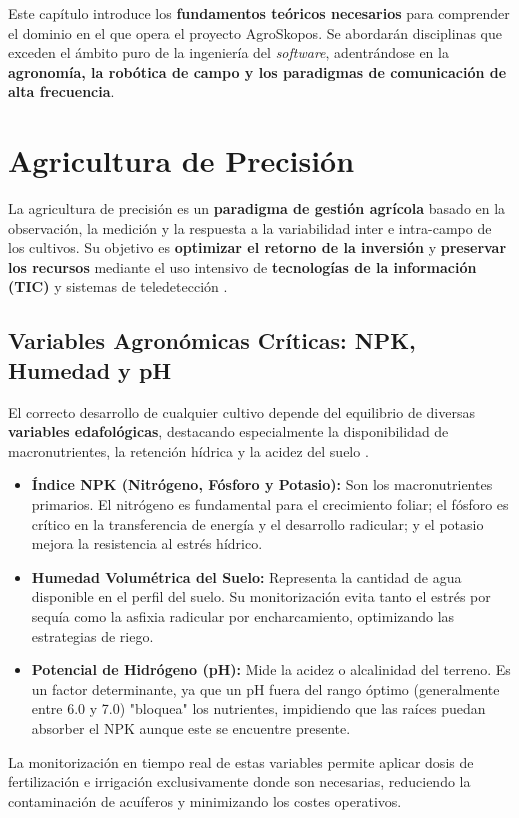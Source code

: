 
Este capítulo introduce los \textbf{fundamentos teóricos necesarios} para comprender el dominio en el que opera el proyecto AgroSkopos. Se abordarán disciplinas que exceden el ámbito puro de la ingeniería del \textit{software}, adentrándose en la \textbf{agronomía, la robótica de campo y los paradigmas de comunicación de alta frecuencia}.

\section{Agricultura de Precisión}

La agricultura de precisión es un \textbf{paradigma de gestión agrícola} basado en la observación, la medición y la respuesta a la variabilidad inter e intra-campo de los cultivos. Su objetivo es \textbf{optimizar el retorno de la inversión} y \textbf{preservar los recursos} mediante el uso intensivo de \textbf{tecnologías de la información (TIC)} y sistemas de teledetección \cite{zhang2002precision, mulla2013twenty}.

\subsection{Variables Agronómicas Críticas: NPK, Humedad y pH}
El correcto desarrollo de cualquier cultivo depende del equilibrio de diversas \textbf{variables edafológicas}, destacando especialmente la disponibilidad de macronutrientes, la retención hídrica y la acidez del suelo \cite{npk_concept, brady2008nature}.
\begin{itemize}
    \item \textbf{Índice NPK (Nitrógeno, Fósforo y Potasio):} Son los macronutrientes primarios. El nitrógeno es fundamental para el crecimiento foliar; el fósforo es crítico en la transferencia de energía y el desarrollo radicular; y el potasio mejora la resistencia al estrés hídrico.
    \item \textbf{Humedad Volumétrica del Suelo:} Representa la cantidad de agua disponible en el perfil del suelo. Su monitorización evita tanto el estrés por sequía como la asfixia radicular por encharcamiento, optimizando las estrategias de riego.
    \item \textbf{Potencial de Hidrógeno (pH):} Mide la acidez o alcalinidad del terreno. Es un factor determinante, ya que un pH fuera del rango óptimo (generalmente entre 6.0 y 7.0) "bloquea" los nutrientes, impidiendo que las raíces puedan absorber el NPK aunque este se encuentre presente.
\end{itemize}
La monitorización en tiempo real de estas variables permite aplicar dosis de fertilización e irrigación exclusivamente donde son necesarias, reduciendo la contaminación de acuíferos y minimizando los costes operativos.

